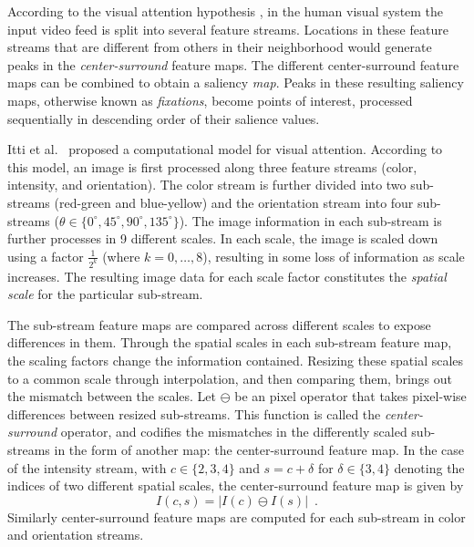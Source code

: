 According to the visual attention hypothesis \cite{koch}, in the 
human visual system the input video feed 
is split into several feature streams.
Locations in these feature streams that are different from others in their neighborhood would generate 
peaks in the \emph{center-surround} feature maps.
The different center-surround feature maps can be combined to obtain a 
saliency \emph{map}.
Peaks in these resulting saliency maps, otherwise known as \emph{fixations}, become 
points of interest, processed sequentially in descending order of their salience values.

Itti et al.~\cite{itti} proposed a computational model for visual attention.
According to this model, an image is first processed along three feature streams 
(color, intensity, and orientation).  
The color stream is further divided into two sub-streams (red-green and blue-yellow) and 
the orientation stream into four sub-streams 
($\theta \in \{0^\circ, 45^\circ, 90^\circ, 135^\circ\}$).
The image information in each sub-stream is further processes in 9 different scales.
In each scale, the image is scaled down using a factor $\frac{1}{2^k}$ (where $k = 0,\ldots,8$),
resulting in some loss of information as scale increases.
The resulting image data for each scale factor constitutes the
\emph{spatial scale} for the particular sub-stream.

The sub-stream feature maps are compared across different scales to expose
differences in them. Through the spatial scales in each sub-stream feature map, the scaling factors change the information
contained. Resizing these spatial scales to a common scale through interpolation, and then comparing them, brings out 
the mismatch between the scales.
Let $\ominus$ be an pixel operator that takes pixel-wise differences between resized sub-streams.  This function is called the \emph{center-surround} operator, and codifies the mismatches in the differently scaled sub-streams in the form of another map: the center-surround feature map.  In the case of
the intensity stream, with $c\in\{2,3,4\}$ and $s=c+\delta$ for $\delta \in \{3,4\}$ denoting the indices of two different spatial scales, the center-surround feature map is given by
%
\begin{equation} \label{intensity-CS}
 I(c,s)=\left|I(c)\ominus I(s)\right| \enspace.
\end{equation}
%
Similarly center-surround feature maps are computed for each sub-stream 
in color and orientation streams. 

